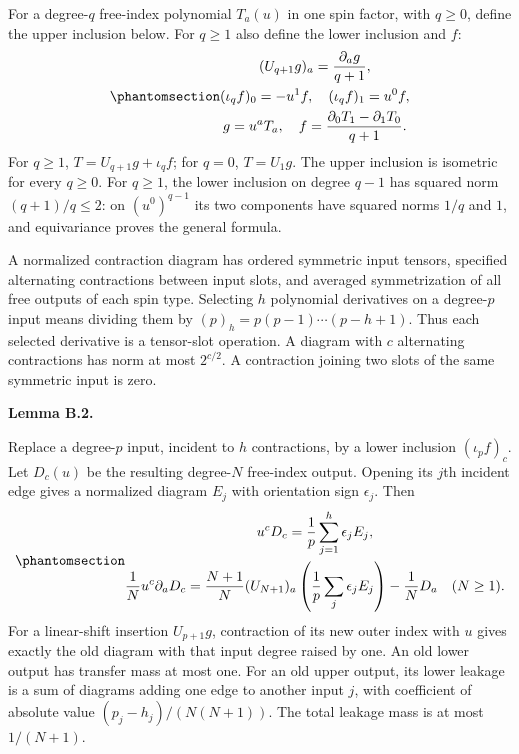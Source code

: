 \documentclass[
  english,
  11pt,
  reqno]{amsart}
\makeatletter
\newcommand{\pandocstatementheading}[1]{%
  \par\addpenalty{\@beginparpenalty}%
  \addvspace{.5\baselineskip plus .2\baselineskip minus .2\baselineskip}%
  {\normalfont\bfseries #1\par}%
  \nobreak\@afterindenttrue\@afterheading
}
\makeatother
\begin{document}
For a degree-\(q\) free-index polynomial \(T_a(u)\) in one spin factor,
with \(q\ge0\), define the upper inclusion below. For \(q\ge1\) also
define the lower inclusion and \(f\):
\begin{equation}\protect\phantomsection\label{eq:gg-budget-strip}{\begin{gathered}
(U_{q+1}g)_a=\frac{\partial_ag}{q+1}, \\
(\iota_qf)_0=-u^1f,\quad(\iota_qf)_1=u^0f, \\
g=u^aT_a,\quad
 f=\frac{\partial_0T_1-\partial_1T_0}{q+1}.
\end{gathered}}\end{equation} For \(q\ge1\), \(T=U_{q+1}g+\iota_qf\); for \(q=0\),
\(T=U_1g\). The upper inclusion is isometric for every \(q\ge0\). For
\(q\ge1\), the lower inclusion on degree \(q-1\) has squared norm
\((q+1)/q\le2\): on \((u^0)^{q-1}\) its two components have squared
norms \(1/q\) and \(1\), and equivariance proves the general formula.

A normalized contraction diagram has ordered symmetric input tensors,
specified alternating contractions between input slots, and averaged
symmetrization of all free outputs of each spin type. Selecting \(h\)
polynomial derivatives on a degree-\(p\) input means dividing them by
\((p)_h=p(p-1)\cdots(p-h+1)\). Thus each selected derivative is a
tensor-slot operation. A diagram with \(c\) alternating contractions has
norm at most \(2^{c/2}\). A contraction joining two slots of the same
symmetric input is zero.

\pandocstatementheading{\protect{}\label{lem:gg-budget-opening}Lemma B.2.}

Replace a degree-\(p\) input, incident to \(h\) contractions, by a lower
inclusion \((\iota_pf)_c\). Let \(D_c(u)\) be the resulting degree-\(N\)
free-index output. Opening its \(j\)th incident edge gives a normalized
diagram \(E_j\) with orientation sign \(\epsilon_j\). Then
\begin{equation}\protect\phantomsection\label{eq:gg-budget-opened-edge}{\begin{gathered}
u^cD_c=\frac1p\sum_{j=1}^h\epsilon_jE_j, \\
\frac1N u^c\partial_aD_c
 =\frac{N+1}{N}(U_{N+1})_a
                 \left(\frac1p\sum_j\epsilon_jE_j\right)
                      -\frac1ND_a\quad(N\ge1).
\end{gathered}}\end{equation} For a linear-shift insertion \(U_{p+1}g\), contraction
of its new outer index with \(u\) gives exactly the old diagram with
that input degree raised by one. An old lower output has transfer mass
at most one. For an old upper output, its lower leakage is a sum of
diagrams adding one edge to another input \(j\), with coefficient of
absolute value \((p_j-h_j)/(N(N+1))\). The total leakage mass is at most
\(1/(N+1)\).
\end{document}
